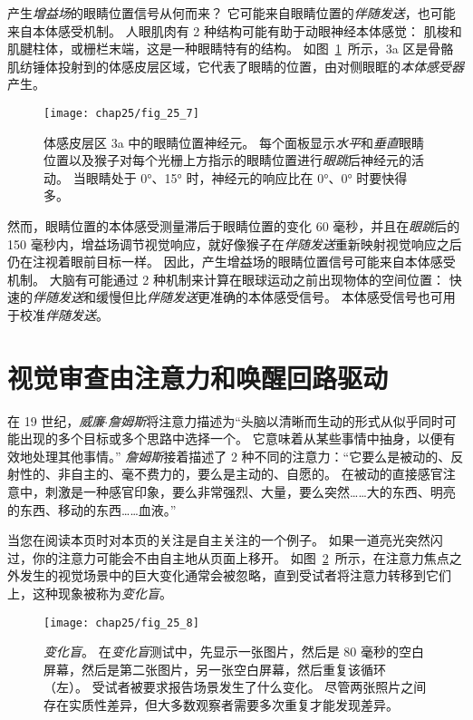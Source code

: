 产生\textit{增益场}的眼睛位置信号从何而来？
它可能来自眼睛位置的\textit{伴随发送}，也可能来自本体感受机制。
人眼肌肉有 2 种结构可能有助于动眼神经本体感觉：
肌梭和肌腱柱体，或栅栏末端，这是一种眼睛特有的结构。
如图~\ref{fig:25_7}~所示，3a 区是骨骼肌纺锤体投射到的体感皮层区域，它代表了眼睛的位置，由对侧眼眶的\textit{本体感受器}产生。


\begin{figure}[htbp]
	\centering
	\texttt{[image: chap25/fig\_25\_7]}
	\caption{体感皮层区 3a 中的眼睛位置神经元。
		每个面板显示\textit{水平}和\textit{垂直}眼睛位置以及猴子对每个光栅上方指示的眼睛位置进行\textit{眼跳}后神经元的活动。
		当眼睛处于 0°、15° 时，神经元的响应比在 0°、0° 时要快得多。}
	\label{fig:25_7}
\end{figure}


然而，眼睛位置的本体感受测量滞后于眼睛位置的变化 60 毫秒，并且在\textit{眼跳}后的 150 毫秒内，增益场调节视觉响应，就好像猴子在\textit{伴随发送}重新映射视觉响应之后仍在注视着眼前目标一样。
因此，产生增益场的眼睛位置信号可能来自本体感受机制。
大脑有可能通过 2 种机制来计算在眼球运动之前出现物体的空间位置：
快速的\textit{伴随发送}和缓慢但比\textit{伴随发送}更准确的本体感受信号。
本体感受信号也可用于校准\textit{伴随发送}。



\section{视觉审查由注意力和唤醒回路驱动}

在 19 世纪，\textit{威廉$\cdot$詹姆斯}将注意力描述为“头脑以清晰而生动的形式从似乎同时可能出现的多个目标或多个思路中选择一个。
它意味着从某些事情中抽身，以便有效地处理其他事情。” 
\textit{詹姆斯}接着描述了 2 种不同的注意力：“它要么是被动的、反射性的、非自主的、毫不费力的，要么是主动的、自愿的。
在被动的直接感官注意中，刺激是一种感官印象，要么非常强烈、大量，要么突然……大的东西、明亮的东西、移动的东西……血液。”


当您在阅读本页时对本页的关注是自主关注的一个例子。
如果一道亮光突然闪过，你的注意力可能会不由自主地从页面上移开。
如图~\ref{fig:25_8}~所示，在注意力焦点之外发生的视觉场景中的巨大变化通常会被忽略，直到受试者将注意力转移到它们上，这种现象被称为\textit{变化盲}。


\begin{figure}[htbp]
	\centering
	\texttt{[image: chap25/fig\_25\_8]}
	\caption{\textit{变化盲}。
		在\textit{变化盲}测试中，先显示一张图片，然后是 80 毫秒的空白屏幕，然后是第二张图片，另一张空白屏幕，然后重复该循环（左）。
		受试者被要求报告场景发生了什么变化。
		尽管两张照片之间存在实质性差异，但大多数观察者需要多次重复才能发现差异。}
	\label{fig:25_8}
\end{figure}


